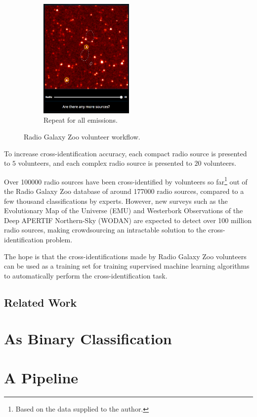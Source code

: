 \documentclass[a4paper]{article}
\begin{document}
\begin{figure}[!ht]
\begin{subfigure}{0.3\textwidth}
            \includegraphics[width=\linewidth, height=2.3in]{images/rgz_done.png}
            \caption{Repeat for all emissions.}
          \end{subfigure}
          \caption{Radio Galaxy Zoo volunteer workflow.}
          \label{fig:rgz}
      \end{figure}

      To increase cross-identification accuracy, each compact radio source is presented to $5$ volunteers, and each complex radio source is presented to $20$ volunteers\cite{banfield15}.

      Over 100000 radio sources have been cross-identified by volunteers so far\footnote{Based on the data supplied to the author.} out of the Radio Galaxy Zoo database of around 177000 radio sources, compared to a few thousand classifications by experts\cite{banfield15}. However, new surveys such as the Evolutionary Map of the Universe (EMU) \cite{norris11} and Westerbork Observations of the Deep APERTIF Northern-Sky (WODAN) \cite{röttgering11} are expected to detect over 100 million radio sources\cite{banfield15}, making crowdsourcing an intractable solution to the cross-identification problem.

      The hope is that the cross-identifications made by Radio Galaxy Zoo volunteers can be used as a training set for training supervised machine learning algorithms to automatically perform the cross-identification task.

    \subsection{Related Work}

  \section{As Binary Classification}

  \section{A Pipeline}

  
  
\end{document}
